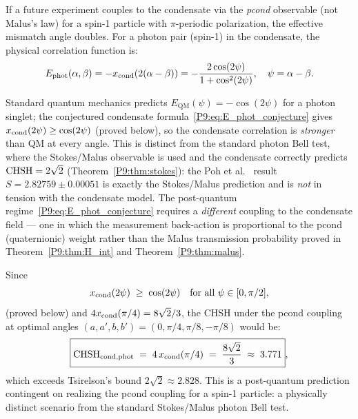\begin{conjecture}
\label{P9:conj:angle_doubling}
If a future experiment couples to the condensate via the \emph{pcond}
observable (not Malus's law) for a spin-1 particle with $\pi$-periodic
polarization, the effective mismatch angle doubles. For a photon pair (spin-1) in the condensate, the physical correlation function is:
\begin{equation}
  E_\mathrm{phot}(\alpha,\beta)
  = -x_{\mathrm{cond}}(2(\alpha-\beta))
  = -\frac{2\cos(2\psi)}{1+\cos^2(2\psi)},
  \quad \psi = \alpha-\beta.
  \label{P9:eq:E_phot_conjecture}
\end{equation}

\begin{remark}
\label{P9:rem:poh}
Standard quantum mechanics predicts $E_\mathrm{QM}(\psi) = -\cos(2\psi)$
for a photon singlet; the conjectured condensate
formula~\eqref{P9:eq:E_phot_conjecture}
gives $x_{\mathrm{cond}}(2\psi)\geq\cos(2\psi)$ (proved below), so the condensate
correlation is \emph{stronger} than QM at every angle.
This is distinct from the standard photon Bell test, where the Stokes/Malus
observable is used and the condensate correctly predicts $\mathrm{CHSH}=2\sqrt{2}$
(Theorem~\ref{P9:thm:stokes}): the Poh et al.~\cite{Poh2015} result
$S=2.82759\pm0.00051$ is exactly the Stokes/Malus prediction and is
\emph{not} in tension with the condensate model.
The post-quantum regime~\eqref{P9:eq:E_phot_conjecture} requires a
\emph{different} coupling to the condensate field --- one in which the
measurement back-action is proportional to the pcond (quaternionic)
weight rather than the Malus transmission probability proved in
Theorem~\ref{P9:thm:H_int} and Theorem~\ref{P9:thm:malus}.
\end{remark}

Since
\begin{equation}
  x_{\mathrm{cond}}(2\psi) \;\geq\; \cos(2\psi)
  \quad\text{for all }\psi\in[0,\pi/2],
  \label{P9:eq:xcond_geq_cos}
\end{equation}
(proved below) and $4x_{\mathrm{cond}}(\pi/4)=8\sqrt{2}/3$,
the CHSH under the pcond coupling at optimal angles
$(a,a',b,b')=(0,\pi/4,\pi/8,-\pi/8)$ would be:
\begin{equation}
  \boxed{\mathrm{CHSH}_\mathrm{cond,phot}
  \;=\; 4\,x_{\mathrm{cond}}(\pi/4)
  \;=\; \frac{8\sqrt{2}}{3}
  \;\approx\; 3.771},
  \label{P9:eq:CHSH_postquantum}
\end{equation}
which exceeds Tsirelson's bound $2\sqrt{2}\approx2.828$.
This is a post-quantum prediction contingent on realizing the pcond coupling
for a spin-1 particle: a physically distinct scenario from the standard
Stokes/Malus photon Bell test.
\end{conjecture}

